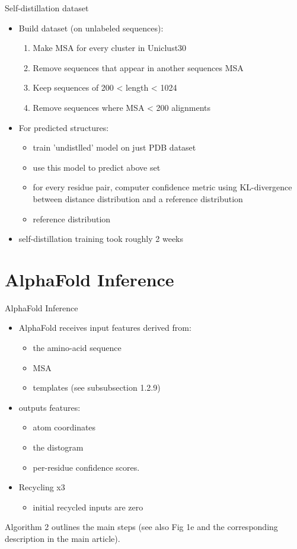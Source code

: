 \documentclass[presentation, smaller]{beamer}
\begin{document}
\begin{frame}[label={sec:org68f2d5b}]{Self-distillation dataset \cite{jumperHighlyAccurateProtein2021}}
\begin{itemize}
\item Build dataset (on unlabeled sequences):
\begin{enumerate}
\item Make MSA for every cluster in Uniclust30
\item Remove sequences that appear in another sequences MSA
\item Keep sequences of 200 < length < 1024
\item Remove sequences where MSA < 200 alignments
\end{enumerate}
\item For predicted structures:
\begin{itemize}
\item train 'undistlled' model on just PDB dataset
\item use this model to predict above set
\item for every residue pair, computer confidence metric using KL-divergence between distance distribution and a reference distribution
\item reference distribution
\end{itemize}
\item self-distillation training took roughly 2 weeks
\end{itemize}
\end{frame}

\section*{AlphaFold Inference}
\label{sec:org8ca1a16}
\begin{frame}[label={sec:org96723e8}]{AlphaFold Inference \cite{jumperHighlyAccurateProtein2021}}
\begin{itemize}
\item AlphaFold receives input features derived from:
\begin{itemize}
\item the amino-acid sequence
\item MSA
\item templates (see subsubsection 1.2.9)
\end{itemize}
\item outputs features:
\begin{itemize}
\item atom coordinates
\item the distogram
\item per-residue confidence scores.
\end{itemize}
\item Recycling x3
\begin{itemize}
\item initial recycled inputs are zero
\end{itemize}
\end{itemize}

Algorithm 2 outlines the main steps (see also Fig 1e and the corresponding description in the main article).
\end{frame}
\end{document}

